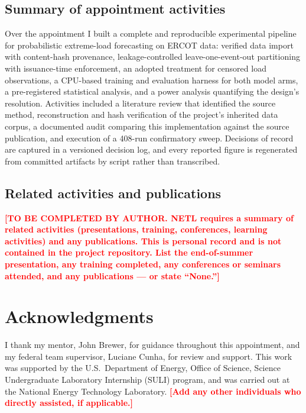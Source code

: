 \documentclass[12pt]{article} %
\newcommand{\TODO}[1]{\textcolor{red}{\textbf{[#1]}}}
\begin{document}
\subsection{Summary of appointment activities}

Over the appointment I built a complete and reproducible experimental pipeline
for probabilistic extreme-load forecasting on ERCOT data: verified data import
with content-hash provenance, leakage-controlled leave-one-event-out partitioning
with issuance-time enforcement, an adopted treatment for censored load
observations, a CPU-based training and evaluation harness for both model arms, a
pre-registered statistical analysis, and a power analysis quantifying the
design's resolution. Activities included a literature review that identified the
source method, reconstruction and hash verification of the project's inherited
data corpus, a documented audit comparing this implementation against the source
publication, and execution of a 408-run confirmatory sweep. Decisions of record
are captured in a versioned decision log, and every reported figure is
regenerated from committed artifacts by script rather than transcribed.

\subsection{Related activities and publications}

\TODO{TO BE COMPLETED BY AUTHOR. NETL requires a summary of related activities
(presentations, training, conferences, learning activities) and any publications.
This is personal record and is not contained in the project repository. List the
end-of-summer presentation, any training completed, any conferences or seminars
attended, and any publications --- or state ``None.''}

\section*{Acknowledgments}

I thank my mentor, John Brewer, for guidance throughout this appointment, and my
federal team supervisor, Luciane Cunha, for review and support. This work was supported by the
U.S.\ Department of Energy, Office of Science, Science Undergraduate Laboratory
Internship (SULI) program, and was carried out at the National Energy Technology
Laboratory. \TODO{Add any other individuals who directly assisted, if applicable.}



\end{document}
